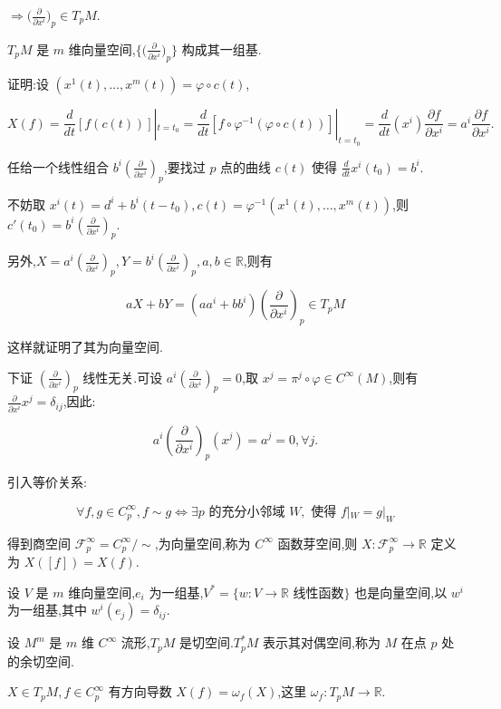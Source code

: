 $\Rightarrow \big(\frac{\partial}{\partial x^i}\big)_p \in T_pM$.

\begin{proposition}
$T_pM$ 是 $m$ 维向量空间,$\{\big(\frac{\partial}{\partial x^i}\big)_p\}$ 构成其一组基.
\end{proposition}

证明:设 $(x^1(t), \ldots, x^m(t)) = \varphi \circ c(t)$,

\[
X(f) = \frac{d}{dt}[f(c(t))]|_{t=t_0} = \frac{d}{dt}[f \circ \varphi^{-1}(\varphi \circ c(t))]|_{t=t_0} = \frac{d}{dt}(x^i) \frac{\partial f}{\partial x^i} = a^i \frac{\partial f}{\partial x^i}.
\]

任给一个线性组合 $b^i(\frac{\partial}{\partial x^i})_p$,要找过 $p$ 点的曲线 $c(t)$ 使得 $\frac{d}{dt}x^i(t_0) = b^i$.

不妨取 $x^i(t) = d^i + b^i(t - t_0), c(t) = \varphi^{-1}(x^1(t), \ldots, x^m(t))$,则 $c'(t_0) = b^i(\frac{\partial}{\partial x^i})_p$.

另外,$X = a^i(\frac{\partial}{\partial x^i})_p, Y = b^i(\frac{\partial}{\partial x^i})_p, a, b \in \mathbb{R}$,则有

\[
aX + bY = (aa^i + bb^i)(\frac{\partial}{\partial x^i})_p \in T_pM
\]

这样就证明了其为向量空间.

下证 $(\frac{\partial}{\partial x^i})_p$ 线性无关.可设 $a^i(\frac{\partial}{\partial x^i})_p = 0$,取 $x^j = \pi^j \circ \varphi \in C^\infty(M)$,则有 $\frac{\partial}{\partial x^i}x^j = \delta_{ij}$,因此:

\[
a^i(\frac{\partial}{\partial x^i})_p(x^j) = a^j = 0, \forall j.
\]

引入等价关系:

\[
\forall f, g \in C_p^\infty, f \sim g \iff \exists p \text{ 的充分小邻域 } W, \text{ 使得 } f|_W = g|_W
\]

得到商空间 $\mathcal{F}_p^\infty = C_p^\infty / \sim$,为向量空间,称为 $C^\infty$ 函数芽空间,则 $X : \mathcal{F}_p^\infty \rightarrow \mathbb{R}$ 定义为 $X([f]) = X(f)$.

设 $V$ 是 $m$ 维向量空间,$e_i$ 为一组基,$V^* = \{w : V \rightarrow \mathbb{R} \text{ 线性函数}\}$ 也是向量空间,以 $w^i$ 为一组基,其中 $w^i(e_j) = \delta_{ij}$.

设 $M^m$ 是 $m$ 维 $C^\infty$ 流形,$T_pM$ 是切空间.$T_p^*M$ 表示其对偶空间,称为 $M$ 在点 $p$ 处的余切空间.

$X \in T_pM, f \in C_p^\infty$ 有方向导数 $X(f) = \omega_f(X)$,这里 $\omega_f : T_pM \rightarrow \mathbb{R}$.

